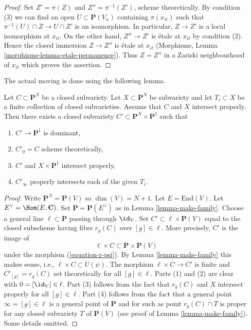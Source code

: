 \begin{proof}
\medskip\noindent
Set $Z' = \pi(Z)$ and $Z'' = \pi^{-1}(Z')$, scheme theoretically. By
condition (3) we can find an open $U \subset \mathbf{P}(V_n)$ containing
$\pi(x_{it})$ such that $\pi^{-1}(U) \cap Z \to U \cap Z'$ is an isomorphism.
In particular, $Z \to Z'$ is a local isomorphism at $x_{it}$.
On the other hand, $Z'' \to Z'$ is \'etale at $x_{it}$ by condition (2).
Hence the closed immersion $Z \to Z''$ is \'etale at $x_{it}$
(Morphisms, Lemma \ref{morphisms-lemma-etale-permanence}).
Thus $Z = Z''$ in a Zariski neighbourhood of $x_{it}$ which proves
the assertion.
\end{proof}

\noindent
The actual moving is done using the following lemma.

\begin{lemma}
\label{lemma-move}
Let $C \subset \mathbf{P}^N$ be a closed subvariety.
Let $X \subset \mathbf{P}^N$ be subvariety and let $T_i \subset X$
be a finite collection of closed subvarieties.
Assume that $C$ and $X$ intersect properly.
Then there exists a closed subvariety
$C' \subset \mathbf{P}^N \times \mathbf{P}^1$ such that
\begin{enumerate}
\item $C' \to \mathbf{P}^1$ is dominant,
\item $C'_0 = C$ scheme theoretically,
\item $C'$ and $X \times \mathbf{P}^1$ intersect properly,
\item $C'_\infty$ properly intersects each of the given $T_i$.
\end{enumerate}
\end{lemma}

\begin{proof}
Write $\mathbf{P}^N = \mathbf{P}(V)$ so $\dim(V) = N + 1$. Let
$E = \text{End}(V)$. Let $E^\vee = \Hom(E, \mathbf{C})$. Set
$\mathbf{P} = \mathbf{P}(E^\vee)$ as in Lemma \ref{lemma-make-family}.
Choose a general line $\ell \subset \mathbf{P}$ passing through $\id_V$.
Set $C' \subset \ell \times \mathbf{P}(V)$ equal to the
closed subscheme having fibre $r_g(C)$ over $[g] \in \ell$.
More precisely, $C'$ is the image of
$$
\ell \times C \subset \mathbf{P} \times \mathbf{P}(V)
$$
under the morphism (\ref{equation-r-psi}). By Lemma \ref{lemma-make-family}
this makes sense, i.e., $\ell \times C \subset U(\psi)$. The morphism
$\ell \times C \to C'$ is finite and $C'_{[g]} = r_g(C)$ set theoretically
for all $[g] \in \ell$. Parts (1) and (2) are clear with
$0 = [\id_V] \in \ell$. Part (3) follows from the fact
that $r_g(C)$ and $X$ intersect properly for all $[g] \in \ell$.
Part (4) follows from the fact that a general point $\infty = [g] \in \ell$
is a general point of $\mathbf{P}$ and for such as point
$r_g(C) \cap T$ is proper for any closed subvariety $T$ of $\mathbf{P}(V)$
(see proof of Lemma \ref{lemma-make-family}).
Some details omitted.
\end{proof}

